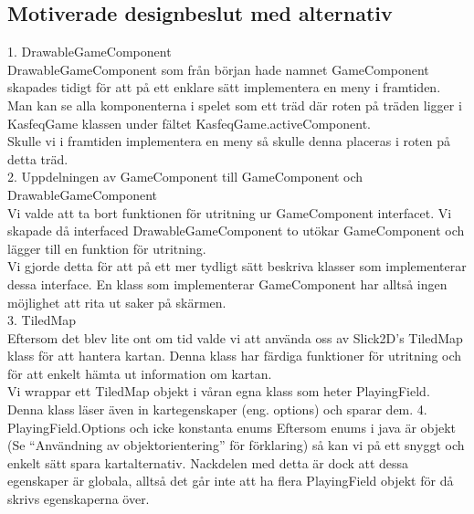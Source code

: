 \subsection{Motiverade designbeslut med alternativ}
1. DrawableGameComponent\\
DrawableGameComponent som från början hade namnet GameComponent skapades tidigt för att på ett enklare sätt implementera en meny i framtiden.\\
Man kan se alla komponenterna i spelet som ett träd där roten på träden ligger i KasfeqGame klassen under fältet KasfeqGame.activeComponent.\\
Skulle vi i framtiden implementera en meny så skulle denna placeras i roten på detta träd.\\
\vspace{11pt}
2. Uppdelningen av GameComponent till GameComponent och DrawableGameComponent\\
Vi valde att ta bort funktionen för utritning ur GameComponent interfacet. Vi skapade då interfaced DrawableGameComponent to utökar GameComponent och lägger till en funktion för utritning.\\
Vi gjorde detta för att på ett mer tydligt sätt beskriva klasser som implementerar dessa interface. En klass som implementerar GameComponent har alltså ingen möjlighet att rita ut saker på skärmen.\\
\vspace{11pt}
3. TiledMap\\
Eftersom det blev lite ont om tid valde vi att använda oss av Slick2D's TiledMap klass för att hantera kartan. Denna klass har färdiga funktioner för utritning och för att enkelt hämta ut information om kartan.\\
Vi wrappar ett TiledMap objekt i våran egna klass som heter PlayingField. Denna klass läser även in kartegenskaper (eng. options) och sparar dem.
\vspace{11pt}
4. PlayingField.Options och icke konstanta enums
Eftersom enums i java är objekt (Se ``Användning av objektorientering'' för förklaring) så kan vi på ett snyggt och enkelt sätt spara kartalternativ. Nackdelen med detta är dock att dessa egenskaper är globala, alltså det går inte att ha flera PlayingField objekt för då skrivs egenskaperna över.
\pagebreak
